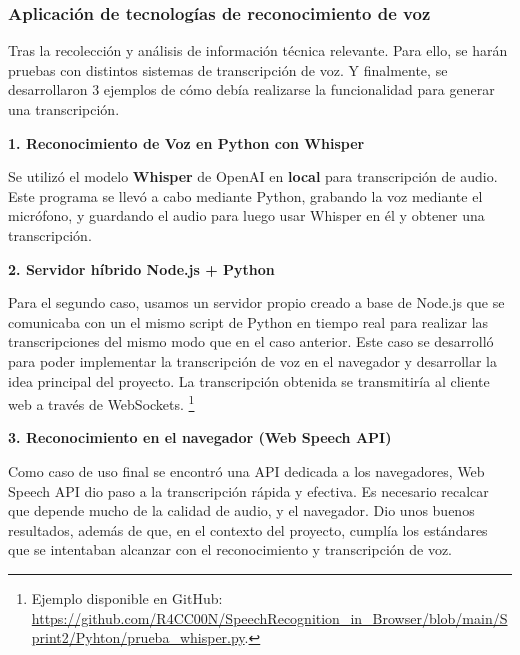 \documentclass[a4paper, 12pt]{book}
\begin{document}
\subsubsection{Aplicación de tecnologías de reconocimiento de voz}
Tras la recolección y análisis de información técnica relevante. 
Para ello, se harán pruebas con distintos sistemas de transcripción de voz. 
Y finalmente, se desarrollaron 3 ejemplos de cómo debía realizarse la funcionalidad para generar una transcripción.

\textbf{1. Reconocimiento de Voz en Python con Whisper}

Se utilizó el modelo \textbf{Whisper} de OpenAI en \textbf{local} para transcripción de audio. 
Este programa se llevó a cabo mediante Python, grabando la voz mediante el micrófono, y guardando el audio para luego usar Whisper en él y obtener una transcripción. 

\textbf{2. Servidor híbrido Node.js + Python}

Para el segundo caso, usamos un servidor propio creado a base de Node.js que se comunicaba con un el mismo script de Python en tiempo real para realizar las transcripciones del mismo modo que en el caso anterior.
Este caso se desarrolló para poder implementar la transcripción de voz en el navegador y desarrollar la idea principal del proyecto.
La transcripción obtenida se transmitiría al cliente web a través de WebSockets.
\footnote{Ejemplo disponible en GitHub: \url{https://github.com/R4CC00N/SpeechRecognition_in_Browser/blob/main/Sprint2/Pyhton/prueba_whisper.py}.}

\textbf{3. Reconocimiento en el navegador (Web Speech API)}

Como caso de uso final se encontró una API dedicada a los navegadores, Web Speech API dio paso a la transcripción rápida y efectiva. Es necesario recalcar que depende mucho de la calidad de audio, y el navegador.
Dio unos buenos resultados, además de que, en el contexto del proyecto, cumplía los estándares que se intentaban alcanzar con el reconocimiento y transcripción de voz.
\end{document}
